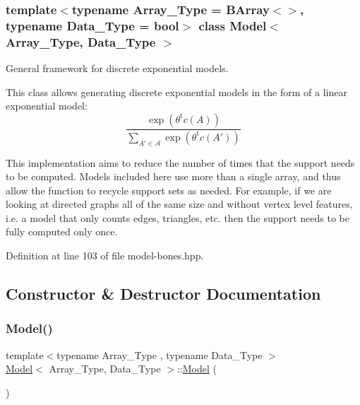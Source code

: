 \subsubsection*{template$<$typename Array\+\_\+\+Type = B\+Array$<$$>$, typename Data\+\_\+\+Type = bool$>$\newline
class Model$<$ Array\+\_\+\+Type, Data\+\_\+\+Type $>$}

General framework for discrete exponential models. 

This class allows generating discrete exponential models in the form of a linear exponential model\+: \[ \frac{ \exp{\left(\theta^{\mbox{t}}c(A)\right)} }{ \sum_{A'\in \mathcal{A}}\exp{\left(\theta^{\mbox{t}}c(A')\right)} } \]

This implementation aims to reduce the number of times that the support needs to be computed. Models included here use more than a single array, and thus allow the function to recycle support sets as needed. For example, if we are looking at directed graphs all of the same size and without vertex level features, i.\+e. a model that only counts edges, triangles, etc. then the support needs to be fully computed only once. 

Definition at line 103 of file model-\/bones.\+hpp.



\subsection{Constructor \& Destructor Documentation}
\mbox{\label{class_model_a38122122aa4eb799b90ed1ee49b9410c}} 
\subsubsection{\texorpdfstring{Model()}{Model()}\hspace{0.1cm}{\footnotesize\ttfamily [1/2]}}
{\footnotesize\ttfamily template$<$typename Array\+\_\+\+Type , typename Data\+\_\+\+Type $>$ \\
\hyperlink{class_model}{Model}$<$ Array\+\_\+\+Type, Data\+\_\+\+Type $>$\+::\hyperlink{class_model}{Model} (\begin{DoxyParamCaption}{ }\end{DoxyParamCaption})\hspace{0.3cm}{\ttfamily [inline]}}



